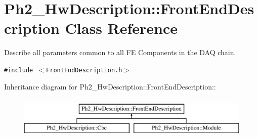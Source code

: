 \hypertarget{class_ph2___hw_description_1_1_front_end_description}{
\section{Ph2\_\-Hw\-Description::Front\-End\-Description Class Reference}
\label{class_ph2___hw_description_1_1_front_end_description}
}
Describe all parameters common to all FE Components in the DAQ chain.  


{\tt \#include $<$Front\-End\-Description.h$>$}

Inheritance diagram for Ph2\_\-Hw\-Description::Front\-End\-Description::\begin{figure}[H]
\begin{center}
\leavevmode
\includegraphics[height=2cm]{class_ph2___hw_description_1_1_front_end_description}
\end{center}
\end{figure}
